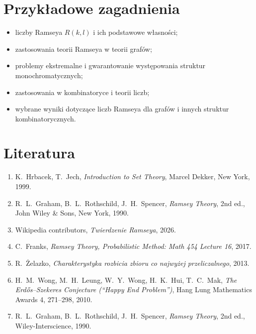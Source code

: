 \documentclass[12pt,a4paper]{article}
\begin{document}
\begin{itemize}
\section*{Przykładowe zagadnienia}

\begin{itemize}[leftmargin=2em]
    \item liczby Ramseya $R(k,l)$ i ich podstawowe własności;
    \item zastosowania teorii Ramseya w teorii grafów;
    \item problemy ekstremalne i gwarantowanie występowania struktur
          monochromatycznych;
    \item zastosowania w kombinatoryce i teorii liczb;
    \item wybrane wyniki dotyczące liczb Ramseya dla grafów i innych
          struktur kombinatorycznych.
\end{itemize}

\section*{Literatura}

\begin{enumerate}[leftmargin=2em]
\item K.\ Hrbacek, T.\ Jech,
    \emph{Introduction to Set Theory}, Marcel Dekker, New York, 1999.

\item R.\ L.\ Graham, B.\ L.\ Rothschild, J.\ H.\ Spencer,
    \emph{Ramsey Theory}, 2nd ed., John Wiley \& Sons, New York, 1990.

\item Wikipedia contributors,
    \emph{Twierdzenie Ramseya}, 2026.

\item C.\ Franks,
    \emph{Ramsey Theory, Probabilistic Method: Math 454 Lecture 16}, 2017.

\item R.\ Żelazko,
    \emph{Charakterystyka rozbicia zbioru co najwyżej przeliczalnego}, 2013.

\item H.\ M.\ Wong, M.\ H.\ Leung, W.\ Y.\ Wong, H.\ K.\ Hui, T.\ C.\ Mak,
    \emph{The Erd{\H{o}}s--Szekeres Conjecture (``Happy End Problem'')},
    Hang Lung Mathematics Awards 4, 271--298, 2010.

  \item R.\ L.\ Graham, B.\ L.\ Rothschild, J.\ H.\ Spencer,
    \emph{Ramsey Theory}, 2nd ed., Wiley-Interscience, 1990.


\end{enumerate}
\end{itemize}
\end{document}
